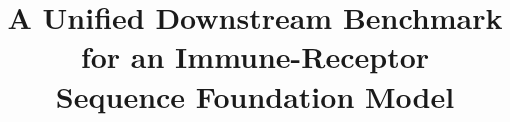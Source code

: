 \documentclass{article}
\title{A Unified Downstream Benchmark for an Immune-Receptor \\ Sequence Foundation Model}
\begin{document}
\maketitle

\begin{abstract}

\end{abstract}


\FloatBarrier

\FloatBarrier





\appendix

\end{document}
